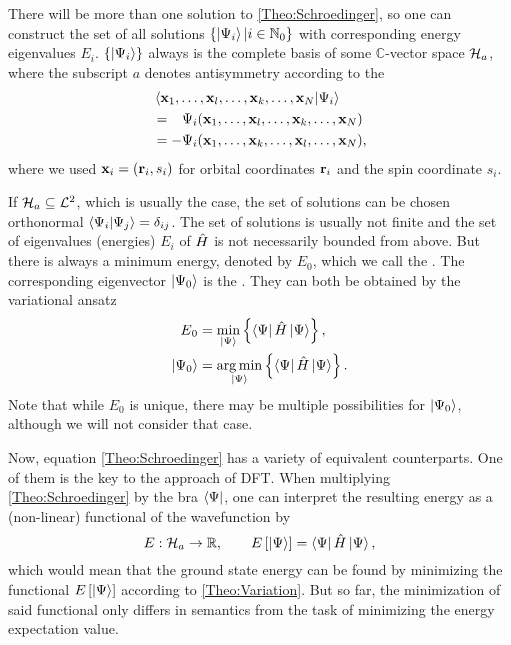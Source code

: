 \documentclass[8.5pt,twoside,twocolumn]{article}
\renewcommand\Hil{\enmat{\mathcal H_a}}
\renewcommand\r{\bo r}
\theoremstyle{standard}
\begin{document}
There will be more than one solution to \eqref{Theo:Schroedinger}, so one can construct the set of all solutions $\left\{{\left|\Psi{_i}\right\rangle | i \in \mathbb{N}_0} \right\}$
with corresponding energy eigenvalues $E_i$. $\left\{{\left|\Psi{_i}\right\rangle} \right\}$ always is the complete basis of
some $\mathbb C$-vector space $\Hil$, where the subscript $a$ denotes antisymmetry according 
to the 
\begin{equation}
\begin{aligned}
 &\bkt{\x_1,\ldots,\x_l,\ldots,\x_k,\ldots,\x_N | \Psi_i } \\
 &=\ph - \Psi_i(\x_1,\ldots,\x_l,\ldots,\x_k,\ldots,\x_N) \\
 &= - \Psi_i(\x_1,\ldots,\x_k,\ldots,\x_l,\ldots,\x_N),
\end{aligned}
\label{Theo:Pauli}
\end{equation}
where we used $\x_i=(\r_i,s_i)$ for orbital coordinates $\r_i$ and the spin coordinate $s_i$.

 If $\Hil \suseq \mathcal {L}^2$, which is usually the case,
the set of solutions can be chosen orthonormal $\left\langle{\Psi_i | \Psi_j}\right\rangle = \delta_{ij}$.
The set of solutions is usually not finite and the set of eigenvalues (energies) $E_i$ of $\hat{H}$
is not necessarily bounded from above. But there is always a minimum energy, denoted by $E_0$, 
which we call the . The corresponding eigenvector 
$\left|\Psi{_0}\right\rangle$ is the . They can both be obtained by the
variational ansatz
\begin{equation}
\begin{aligned}
 E{_0}&= \min_{\left|\Psi{}\right\rangle} \left\{{ \left\langle\Psi{}\right| \hat{H} \left|\Psi{}\right\rangle} \right\}, \\
 \left|\Psi{_0}\right\rangle&= \operatorname*{arg\,min}_{\left|\Psi{}\right\rangle} \left\{{ \left\langle\Psi{}\right| \hat{H} \left|\Psi{}\right\rangle} \right\}.
\end{aligned}
\label{Theo:Variation}
\end{equation}
Note that while $E_0$ is unique, there may be multiple possibilities for $\left|\Psi{_0}\right\rangle$, although
we will not consider that case.

Now, equation \eqref{Theo:Schroedinger} has a variety of equivalent counterparts. One of them
is the key to the approach of DFT. When multiplying \eqref{Theo:Schroedinger} by the bra $\left\langle\Psi{}\right|$,
one can interpret the resulting energy as a (non-linear) functional of the wavefunction by
\begin{equation}
 E : \Hil \rar \R, \qquad E\ed{\keP{}}=\brP{} \Ha \keP{},
 \label{Theo:WaveFunctional}
\end{equation}
which would mean that the ground state energy can be found by minimizing the functional
$E\left[{\left|\Psi{}\right\rangle}\right]$ according to \eqref{Theo:Variation}. But so far, the minimization
of said functional only differs in semantics from the task of minimizing the energy expectation value.
\end{document}
